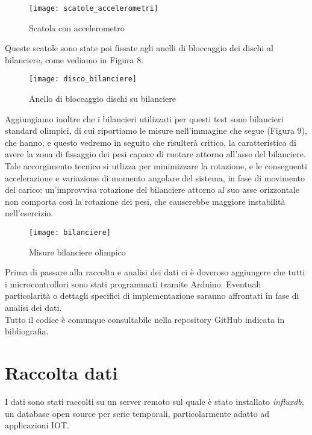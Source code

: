 \documentclass[fleqn,10pt]{SelfArx} %
\begin{document}
\begin{figure}[htb!]\centering
	\texttt{[image: scatole\_accelerometri]}
	\caption{Scatola con accelerometro}
	\label{fig:modulo accelerometro}
\end{figure}

Queste scatole sono state poi fissate agli anelli di bloccaggio dei dischi al bilanciere, come vediamo in Figura 8.

\begin{figure}[htb!]\centering
	\texttt{[image: disco\_bilanciere]}
	\caption{Anello di bloccaggio dischi su bilanciere}
	\label{fig:anello di bloccaggio}
\end{figure}

Aggiungiamo inoltre che i bilancieri utilizzati per questi test sono bilancieri standard olimpici, di cui riportiamo 
le misure nell'immagine che segue (Figura 9), che hanno, e questo vedremo in seguito che risulterà critico, 
la caratteristica di avere la zona di fissaggio dei pesi capace di ruotare attorno all'asse del bilanciere. \\
Tale accorgimento tecnico si utlizza per minimizzare la rotazione, e le conseguenti accelerazione e variazione 
di momento angolare del sistema, in fase di movimento del carico: un'improvvisa rotazione del bilanciere attorno 
al suo asse orizzontale non comporta così la rotazione dei pesi, che causerebbe maggiore instabilità nell'esercizio.

\begin{figure}[htb!]\centering
	\texttt{[image: bilanciere]}
	\caption{Misure bilanciere olimpico}
	\label{fig:bilanciere}
\end{figure}

Prima di passare alla raccolta e analisi dei dati ci è doveroso aggiungere che tutti i microcontrollori sono stati 
programmati tramite Arduino. Eventuali particolarità o dettagli specifici di implementazione saranno affrontati in fase 
di analisi dei dati. \\
Tutto il codice è comunque consultabile nella repository GitHub indicata in bibliografia.

\section{Raccolta dati}

I dati sono stati raccolti su un server remoto sul quale è stato installato \textit{influxdb}, un database open source 
per serie temporali, particolarmente adatto ad applicazioni IOT.\\
\end{document}
